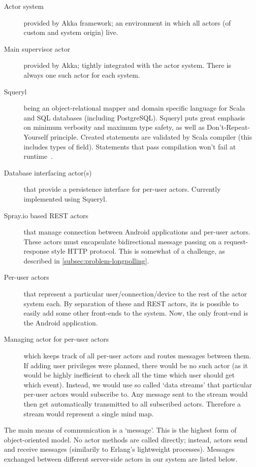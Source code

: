 \begin{description}
	\item[Actor system]{provided by Akka framework; an environment in which all actors (of custom and system origin) live.}
	\item[Main supervisor actor]{provided by Akka; tightly integrated with the actor system. There is always one such actor for each system.}
	\item[Squeryl]{being an object-relational mapper and domain specific language for Scala and SQL databases (including PostgreSQL). Squeryl puts great emphasis on minimum verbosity and maximum type safety, as well as Don't-Repeat-Yourself principle. Created statements are validated by Scala compiler (this includes types of field). Statements that pass compilation won't fail at runtime~\cite{Squeryl:Intro}.}
	\item[Database interfacing actor(s)]{that provide a persistence interface for per-user actors. Currently implemented using Squeryl.}
	\item[Spray.io based REST actors]{that manage connection between Android applications and per-user actors. These actors must encapsulate bidirectional message passing on a request-response style HTTP protocol. This is somewhat of a challenge, as described in \cref{subsec:problem-longpolling}.}
	\item[Per-user actors]{that represent a particular user/connection/device to the rest of the actor system each. By separation of these and REST actors, its is possible to easily add some other front-ends to the system. Now, the only front-end is the Android application.}
	\item[Managing actor for per-user actors]{which keeps track of all per-user actors and routes messages between them. If adding user privileges were planned, there would be no such actor (as it would be highly inefficient to check all the time which user should get which event). Instead, we would use so called `data streams' that particular per-user actors would subscribe to. Any message sent to the stream would then get automatically transmitted to all subscribed actors. Therefore a stream would represent a single mind map.}
\end{description}

The main means of communication is a `message'. This is the highest form of object-oriented model. No actor methods are called directly; instead, actors send and receive messages (similarily to Erlang's lightweight processes). Messages exchanged between different server-side actors in our system are listed below.

